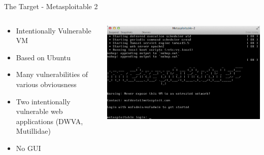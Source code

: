 \documentclass{beamer}
\begin{document}
	\begin{frame}{The Target - Metasploitable 2}
            		\begin{columns}
             		\begin{column}{0.5\textwidth}
                			\begin{itemize}
                    			\item Intentionally Vulnerable VM
                    			\item Based on Ubuntu
                    			\item Many vulnerabilities of various obviousness
					\item Two intentionally vulnerable web applications (DWVA, Mutillidae)
					\item No GUI
                			\end{itemize}
              		\end{column}
            
            		\begin{column}{0.5\textwidth}
				\begin{center}
                 		\includegraphics[width=\textwidth]{metasploitable2_booted.png}
				\end{center}
              		\end{column}
            		\end{columns}				
	\end{frame}	
\end{document}
